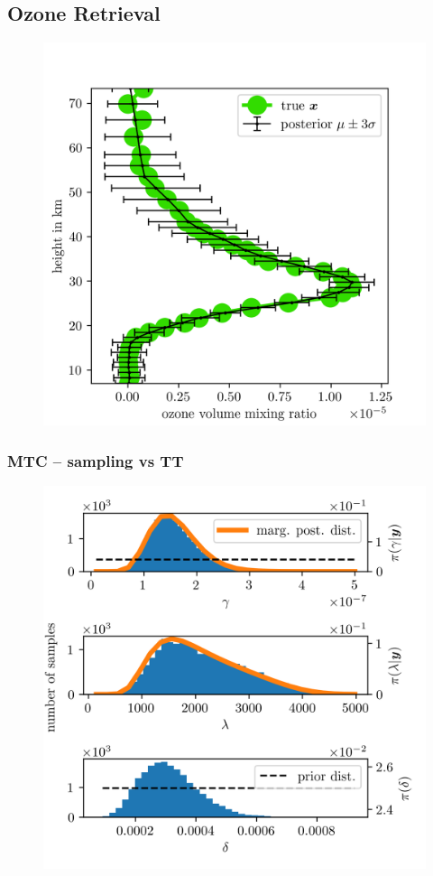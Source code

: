 \subsection{Ozone Retrieval}
\begin{figure}[ht!]
	\centering
	\includegraphics{secRecRes.png}
	\caption[]{}
	\label{fig:}
\end{figure}

\subsubsection{MTC --  sampling vs TT}
\begin{figure}[ht!]
	\centering
	\includegraphics{secSIRTMargMargO3Res.png}
	\caption[]{}
	\label{fig:}
\end{figure}
